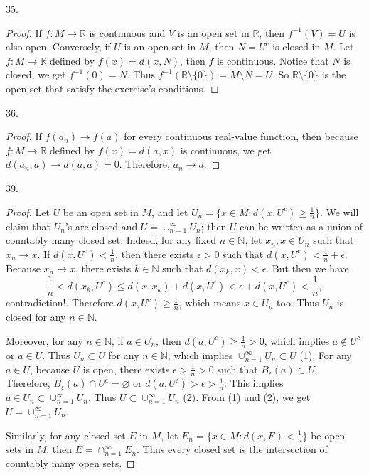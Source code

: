 \documentclass[12pt, a4paper]{article}
\theoremstyle{plain}
\newcommand{\N}{\mathbb{N}}
\newcommand{\R}{\mathbb{R}}
\begin{document}
35.
\begin{proof}
If $f:M\rightarrow\R$ is continuous and $V$ is an open set in $\R$, then $f^{-1}(V)=U$ is also open. Conversely, if $U$ is an open set in $M$, then $N=U^c$ is closed in $M$. Let $f:M\rightarrow \R$ defined by $f(x)=d(x,N)$, then $f$ is continuous. Notice that $N$ is closed, we get $f^{-1}(0)=N$. Thus $f^{-1}(\R\setminus\{0\})=M\setminus N=U$. So $\R\setminus\{0\}$ is the open set that satisfy the exercise's conditions. 
\end{proof}

36.
\begin{proof}
If $f(a_n)\rightarrow f(a)$ for every continuous real-value function, then because $f:M\rightarrow\R$ defined by $f(x)=d(a,x)$ is continuous, we get $d(a_n,a)\rightarrow d(a,a)=0$. Therefore, $a_n\rightarrow a$.
\end{proof}

39.
\begin{proof}
Let $U$ be an open set in $M$, and let $U_n=\{x\in M:d(x,U^c)\geq \frac{1}{n}\}$. We will claim that $U_n$'s are closed and $U=\cup_{n=1}^{\infty}{U_n}$; then $U$ can be written as a union of countably many closed set. Indeed, for any fixed $n\in\N$, let $x_n,x\in U_n$ such that $x_n\rightarrow x$. If $d(x,U^c)<\frac{1}{n}$, then there exists $\epsilon>0$ such that $d(x,U^c)<\frac{1}{n}+\epsilon$. Because $x_n\rightarrow x$, there exists $k\in\N$ such that $d(x_k,x)<\epsilon$. But then we have
\[
\frac{1}{n}<d(x_k,U^c)\leq d(x,x_k)+d(x,U^c)<\epsilon +d(x,U^c)<\frac{1}{n},
\]
contradiction!. Therefore $d(x,U^c)\geq \frac{1}{n}$, which means $x\in U_n$ too. Thus $U_n$ is closed for any $n\in\N$. 

Moreover, for any $n\in \N$, if $a\in U_n$, then $d(a,U^c)\geq \frac{1}{n}>0$, which implies $a\notin U^c$ or $a\in U$. Thus $U_n\subset U$ for any $n\in\N$, which implies $\cup_{n=1}^{\infty}U_n\subset U$ (1). For any $a\in U$, because $U$ is open, there exists $\epsilon>\frac{1}{n}>0$ such that $B_\epsilon(a)\subset U$. Therefore, $B_\epsilon(a)\cap U^c=\varnothing$ or $d(a,U^c)>\epsilon>\frac{1}{n}$. This implies $a\in U_n\subset \cup_{n=1}^{\infty}U_n$. Thus $U\subset \cup_{n=1}^{\infty}U_n$ (2). From (1) and (2), we get $U=\cup_{n=1}^{\infty}U_n$.

Similarly, for any closed set $E$ in $M$, let $E_n=\{x\in M:d(x,E)<\frac{1}{n}\}$ be open sets in $M$, then $E=\cap_{n=1}^{\infty}E_n$. Thus every closed set is the intersection of countably many open sets.
\end{proof}
\end{document}
